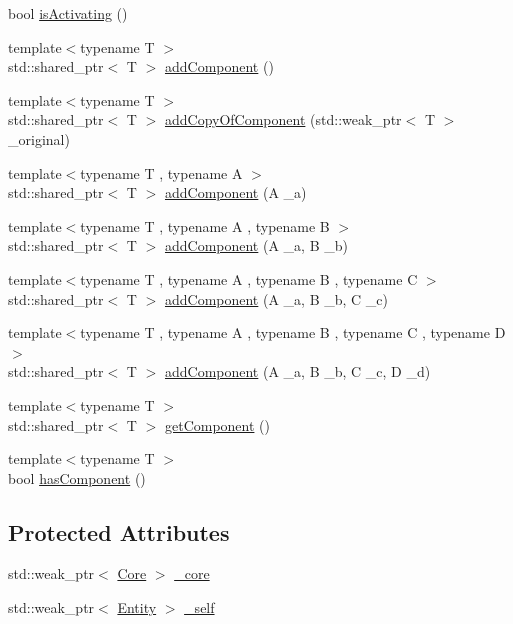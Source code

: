 \begin{DoxyCompactItemize}
\item 
bool \hyperlink{classfrontier_1_1_entity_a4de39f3a34645051d7d223b3f744761c}{is\+Activating} ()
\item 
{\footnotesize template$<$typename T $>$ }\\std\+::shared\+\_\+ptr$<$ T $>$ \hyperlink{classfrontier_1_1_entity_a7f78d98f8636d2db6fd9f6c6259f35cd}{add\+Component} ()
\item 
{\footnotesize template$<$typename T $>$ }\\std\+::shared\+\_\+ptr$<$ T $>$ \hyperlink{classfrontier_1_1_entity_a7e8950fc46a87fca465a94f66ac40494}{add\+Copy\+Of\+Component} (std\+::weak\+\_\+ptr$<$ T $>$ \+\_\+original)
\item 
{\footnotesize template$<$typename T , typename A $>$ }\\std\+::shared\+\_\+ptr$<$ T $>$ \hyperlink{classfrontier_1_1_entity_ab47b8543ddd540ce1ffb37c42f1d26fd}{add\+Component} (A \+\_\+a)
\item 
{\footnotesize template$<$typename T , typename A , typename B $>$ }\\std\+::shared\+\_\+ptr$<$ T $>$ \hyperlink{classfrontier_1_1_entity_a7b52a24fa9ecfe390bf0353ce9f87432}{add\+Component} (A \+\_\+a, B \+\_\+b)
\item 
{\footnotesize template$<$typename T , typename A , typename B , typename C $>$ }\\std\+::shared\+\_\+ptr$<$ T $>$ \hyperlink{classfrontier_1_1_entity_a0e27fe11f4f655d6ba1a63a5594d4efb}{add\+Component} (A \+\_\+a, B \+\_\+b, C \+\_\+c)
\item 
{\footnotesize template$<$typename T , typename A , typename B , typename C , typename D $>$ }\\std\+::shared\+\_\+ptr$<$ T $>$ \hyperlink{classfrontier_1_1_entity_a0a77572b04da8df53eea3aab783df9c7}{add\+Component} (A \+\_\+a, B \+\_\+b, C \+\_\+c, D \+\_\+d)
\item 
{\footnotesize template$<$typename T $>$ }\\std\+::shared\+\_\+ptr$<$ T $>$ \hyperlink{classfrontier_1_1_entity_a7657bce9cd7f405f69e59c61a69adf86}{get\+Component} ()
\item 
{\footnotesize template$<$typename T $>$ }\\bool \hyperlink{classfrontier_1_1_entity_a52e5f9cb6d6f8fddef34f58b7cc5daa8}{has\+Component} ()
\end{DoxyCompactItemize}
\subsection*{Protected Attributes}
\begin{DoxyCompactItemize}
\item 
std\+::weak\+\_\+ptr$<$ \hyperlink{classfrontier_1_1_core}{Core} $>$ \hyperlink{classfrontier_1_1_entity_aa6157be575485f3a37f11e57b5c8898e}{\+\_\+core}
\item 
std\+::weak\+\_\+ptr$<$ \hyperlink{classfrontier_1_1_entity}{Entity} $>$ \hyperlink{classfrontier_1_1_entity_a29a54e9eb639ffa8ac51d2087b2c1ed5}{\+\_\+self}
\end{DoxyCompactItemize}


